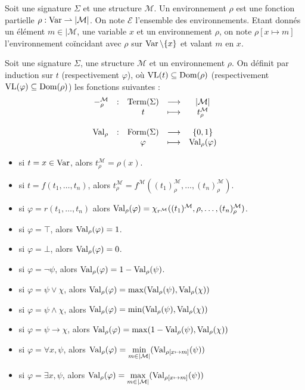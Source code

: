 \begin{definition}[Environnement]
  Soit une signature $\Sigma$ et une structure $\mathcal M$. Un environnement
  $\rho$ est une fonction partielle $\rho : \operatorname{Var}\rightharpoonup |\mathcal M|$. On note
  $\mathcal E$ l'ensemble des environnements. Etant donnés un élément
  $m\in|\mathcal M$, une variable $x$ et un environnement $\rho$, on note
  $\rho[x \mapsto m]$ l'environnement coïncidant avec $\rho$ sur
  $\operatorname{Var}\backslash\{x\}$ et valant $m$ en $x$.
\end{definition}

\begin{definition}
  Soit une signature $\Sigma$, une structure $\mathcal M$ et un environnement
  $\rho$. On définit par induction sur $t$ (respectivement $\varphi$), où
  $\operatorname{VL}(t)\subseteq\operatorname{Dom}(\rho)$ (respectivement $\operatorname{VL}(\varphi)\subseteq\operatorname{Dom}(\rho)$)
  les fonctions suivantes :
  \[\begin{array}{rcccc}
  -_\rho^\mathcal M & : & \operatorname{Term}(\Sigma) & \longrightarrow & |\mathcal M|\\
  & & t & \longmapsto & t^{\mathcal M}_\rho\\
  \\
  \operatorname{Val}_\rho & : & \operatorname{Form}(\Sigma) & \longrightarrow & \{0,1\}\\
  & & \varphi & \longmapsto & \operatorname{Val}_\rho(\varphi)
  \end{array}\]

  \begin{itemize}
  \item si $t = x \in \operatorname{Var}$, alors $t^\mathcal M_\rho = \rho(x)$.
  \item si $t = f(t_1,\ldots,t_n)$, alors
    $t_\rho^\mathcal M =
    f^\mathcal M((t_1)^\mathcal M_\rho,\ldots,(t_n)^\mathcal M_\rho)$.
  \item si $\varphi = r(t_1,\ldots,t_n)$ alors
    $\operatorname{Val}_\rho(\varphi) =
    \chi_{r^\mathcal M}((t_1)^\mathcal M,\rho,\ldots,(t_n)^\mathcal M_\rho)$.
  \item si $\varphi = \top$, alors $\operatorname{Val}_\rho(\varphi) = 1$.
  \item si $\varphi = \bot$, alors $\operatorname{Val}_\rho(\varphi) = 0$.
  \item si $\varphi = \lnot \psi$, alors
    $\operatorname{Val}_\rho(\varphi) = 1 - \operatorname{Val}_\rho(\psi)$.
  \item si $\varphi = \psi \lor \chi$, alors
    $\operatorname{Val}_\rho(\varphi) = \max(\operatorname{Val}_\rho(\psi),\operatorname{Val}_\rho(\chi))$
  \item si $\varphi = \psi \land \chi$, alors
    $\operatorname{Val}_\rho(\varphi) = \min(\operatorname{Val}_\rho(\psi),\operatorname{Val}_\rho(\chi))$
  \item si $\varphi = \psi \to \chi$, alors
    $\operatorname{Val}_\rho(\varphi) = \max(1 - \operatorname{Val}_\rho(\psi),\operatorname{Val}_\rho(\chi))$
  \item si $\varphi = \forall x, \psi$, alors
    $\displaystyle\operatorname{Val}_\rho(\varphi) =
    \min_{m \in |\mathcal M|}(\operatorname{Val}_{\rho[x\mapsto m]}(\psi))$
  \item si $\varphi = \exists x, \psi$, alors
    $\displaystyle\operatorname{Val}_\rho(\varphi) =
    \max_{m \in |\mathcal M|}(\operatorname{Val}_{\rho[x\mapsto m]}(\psi))$
  \end{itemize}
  

\end{definition}
